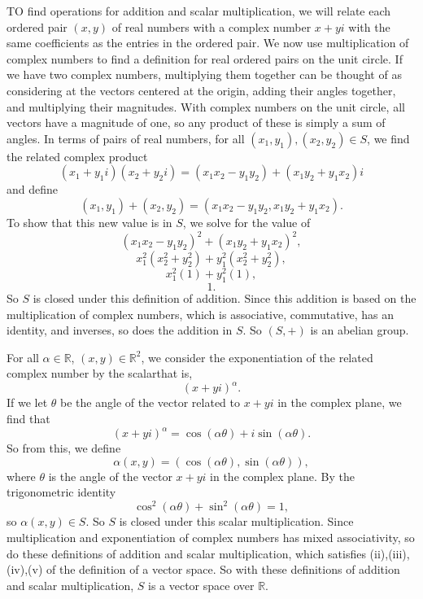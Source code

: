 \documentclass[12pt]{article}
\newcommand{\R}{\mathbb{R}}
\begin{document}
TO find operations for addition and scalar multiplication, we will relate each ordered pair $(x,y)$ of real numbers with a complex number $x+yi$ with the same coefficients as the entries in the ordered pair. We now use multiplication of complex numbers to find a definition for real ordered pairs on the unit circle. If we have two complex numbers, multiplying them together can be thought of as considering at the vectors centered at the origin, adding their angles together, and multiplying their magnitudes. With complex numbers on the unit circle, all vectors have a magnitude of one, so any product of these is simply a sum of angles. In terms of pairs of real numbers, for all $(x_1,y_1),(x_2,y_2)\in S$, we find the related complex product
\[(x_1 + y_1i)(x_2 + y_2i) = (x_1x_2 - y_1y_2) + (x_1y_2 + y_1x_2)i\]
and define
\[(x_1,y_1) + (x_2, y_2) = (x_1x_2 - y_1y_2, x_1y_2 + y_1x_2).\]
To show that this new value is in $S$, we solve for the value of
\[(x_1x_2 - y_1y_2)^2 + (x_1y_2 + y_1x_2)^2,\]
\[x_1^2(x_2^2 + y_2^2) + y_1^2(x_2^2 + y_2^2),\]
\[x_1^2(1) + y_1^2(1),\]
\[1.\]
So $S$ is closed under this definition of addition. Since this addition is based on the multiplication of complex numbers, which is associative, commutative, has an identity, and inverses, so does the addition in $S$. So $(S, +)$ is an abelian group. 

For all $\alpha\in\R$, $(x,y)\in\R^2$, we consider the exponentiation of the related complex number by the scalar\textemdash that is,
\[(x+yi)^\alpha.\]
If we let $\theta$ be the angle of the vector related to $x+yi$ in the complex plane, we find that
\[(x+yi)^\alpha = \cos(\alpha \theta) + i\sin(\alpha \theta).\]
So from this, we define
\[\alpha(x,y) = (\cos(\alpha \theta), \sin(\alpha \theta)),\]
where $\theta$ is the angle of the vector $x+yi$ in the complex plane. By the trigonometric identity
\[\cos^2(\alpha \theta) + \sin^2(\alpha \theta) = 1,\]
so $\alpha(x,y)\in S$. So $S$ is closed under this scalar multiplication. Since multiplication and exponentiation of complex numbers has mixed associativity, so do these definitions of addition and scalar multiplication, which satisfies (ii),(iii),(iv),(v) of the definition of a vector space. So with these definitions of addition and scalar multiplication, $S$ is a vector space over $\R$.
\end{document}
